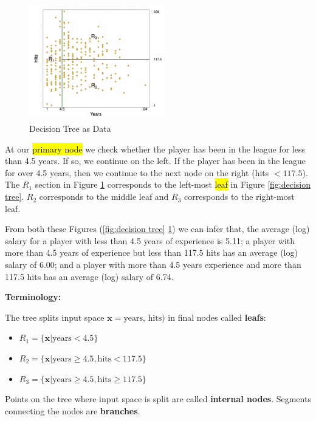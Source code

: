 \documentclass[11pt]{article}
\begin{document}
\begin{figure}[h]
    \centering
    \includegraphics[width=6cm]{pic/decision tree parts.png}
    \caption{Decision Tree as Data}
    \label{fig:decision tree parts}
\end{figure}

At our \hl{primary node} we check whether the player has been in the league for less than 4.5 years. If so, we continue on the left. If the player has been in the league for over 4.5 years, then we continue to the next node on the right (hits $< 117.5$). The $R_1$ section in Figure \ref{fig:decision tree parts} corresponds to the left-most \hl{leaf} in Figure \ref{fig:decision tree}. $R_2$ corresponds to the middle leaf and $R_3$ corresponds to the right-most leaf. 

\begin{note}
    From both these Figures (\ref{fig:decision tree} \ref{fig:decision tree parts}) we can infer that, the average (log) salary for a player with less than 4.5 years of experience is 5.11; a player with more than 4.5 years of experience but less than 117.5 hits has an average (log) salary of 6.00; and a player with more than 4.5 years experience and more than 117.5 hits has an average (log) salary of 6.74.
\end{note}

\begin{shaded}
    \textbf{Terminology:}

    The tree splits input space $\mathbf{x} = \text{years, hits})$ in final nodes called \textbf{leafs}:

    \begin{itemize}
        \item $R_1 = \{\mathbf{x}|\text{years} < 4.5\}$
        \item $R_2 = \{\mathbf{x}|\text{years} \geq 4.5, \text{hits}<117.5\}$
        \item $R_3 = \{\mathbf{x}|\text{years} \geq 4.5, \text{hits}\geq 117.5\}$
    \end{itemize}

    Points on the tree where input space is split are called \textbf{internal nodes}. Segments connecting the nodes are \textbf{branches}.
\end{shaded}
\end{document}
